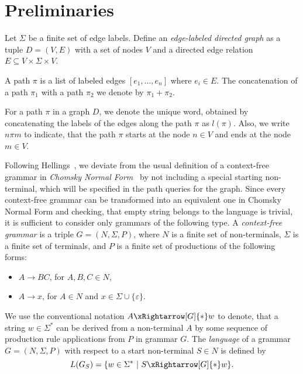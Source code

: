 \section{Preliminaries}
\label{section_preliminaries}

Let $\Sigma$ be a finite set of edge labels. Define an \emph{edge-labeled directed graph} as a tuple \mbox{$D = (V, E)$} with a set of nodes $V$ and a directed edge relation \mbox{$E \subseteq V \times \Sigma \times V$}.

A path $\pi$ is a list of labeled edges $[e_1,\ldots,e_n]$ where $e_i \in E$. The concatenation of a path $\pi_1$ with a path $\pi_2$ we denote by $\pi_1 + \pi_2$.

For a path $\pi$ in a graph $D$, we denote the unique word, obtained by concatenating the labels of the edges along the path $\pi$ as \mbox{$l(\pi)$}. Also, we write \mbox{$n \pi m$} to indicate, that the path $\pi$ starts at the node \mbox{$n \in V$} and ends at the node \mbox{$m \in V$}.

Following Hellings~\cite{hellingsRelational}, we deviate from the usual definition of a context-free grammar in \emph{Chomsky Normal Form}~\cite{chomsky} by not including a special starting non-terminal, which will be specified in the path queries for the graph. Since every context-free grammar can be transformed into an equivalent one in Chomsky Normal Form and checking, that empty string belongs to the language is trivial, it is sufficient to consider only grammars of the following type. A \emph{context-free grammar} is a triple \mbox{$G = (N, \Sigma, P)$}, where $N$ is a finite set of non-terminals, $\Sigma$ is a finite set of terminals, and $P$ is a finite set of productions of the following forms:

\begin{itemize}
    \item $A \rightarrow B C$, for $A,B,C \in N$,
    \item $A \rightarrow x$, for $A \in N$ and $x \in \Sigma \cup \{\varepsilon\}$.   
\end{itemize}

We use the conventional notation \mbox{$A \xRightarrow[G]{*} w$} to denote, that a string \mbox{$w \in \Sigma^*$} can be derived from a non-terminal $A$ by some sequence of production rule applications from $P$ in grammar $G$. The \emph{language} of a grammar \mbox{$G = (N,\Sigma,P)$} with respect to a start non-terminal \mbox{$S \in N$} is defined by $$L(G_S) = \{w \in \Sigma^*~|~S \xRightarrow[G]{*} w\}.$$

